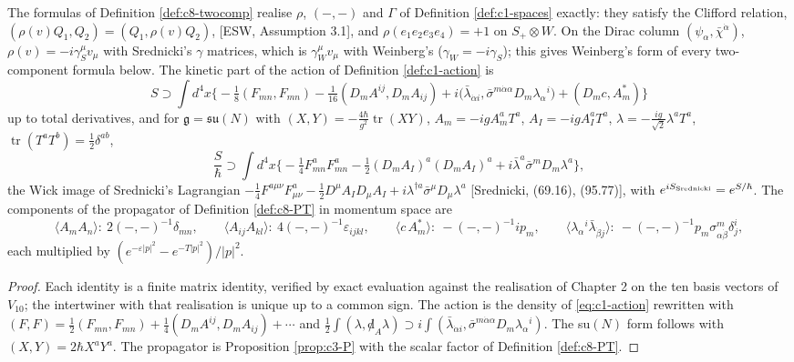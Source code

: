 \begin{definition}
\end{definition}

\begin{proposition}
\label{prop:c8-twocomp}
The formulas of Definition \ref{def:c8-twocomp} realise $\rho$, $(-,-)$ and $\Gamma$ of Definition \ref{def:c1-spaces} exactly: they satisfy the Clifford relation, $(\rho(v)Q_1,Q_2)=(Q_1,\rho(v)Q_2)$, [ESW, Assumption 3.1], and $\rho(e_1e_2e_3e_4)=+1$ on $S_+\otimes W$. On the Dirac column $(\psi_\alpha,\bar\chi^{\dot\alpha})$, $\rho(v)=-i\gamma_S^\mu v_\mu$ with Srednicki's $\gamma$ matrices, which is $\gamma_W^\mu v_\mu$ with Weinberg's ($\gamma_W=-i\gamma_S$); this gives Weinberg's form of every two-component formula below. The kinetic part of the action of Definition \ref{def:c1-action} is
\[
S\supset\int d^4x\Big\{-\tfrac18(F_{mn},F_{mn})-\tfrac1{16}(D_mA^{ij},D_mA_{ij})+i\big(\bar\lambda_{\dot\alpha i},\bar\sigma^{m\dot\alpha\alpha}D_m\lambda_\alpha{}^i\big)+(D_mc,A^*_m)\Big\}
\]
up to total derivatives, and for $\mathfrak g=\mathfrak{su}(N)$ with $(X,Y)=-\tfrac{4\hbar}{g^2}\operatorname{tr}(XY)$, $A_m=-igA^a_mT^a$, $A_I=-igA^a_IT^a$, $\lambda=-\tfrac{ig}{\sqrt2}\lambda^aT^a$, $\operatorname{tr}(T^aT^b)=\tfrac12\delta^{ab}$,
\[
\frac S\hbar\supset\int d^4x\Big\{-\tfrac14F^a_{mn}F^a_{mn}-\tfrac12(D_mA_I)^a(D_mA_I)^a+i\bar\lambda^a\bar\sigma^mD_m\lambda^a\Big\},
\]
the Wick image of Srednicki's Lagrangian $-\tfrac14F^{a\mu\nu}F^a_{\mu\nu}-\tfrac12D^\mu A_ID_\mu A_I+i\lambda^{\dagger a}\bar\sigma^\mu D_\mu\lambda^a$ [Srednicki, (69.16), (95.77)], with $e^{iS_{\rm Srednicki}}=e^{S/\hbar}$. The components of the propagator of Definition \ref{def:c8-PT} in momentum space are
\[
\langle A_mA_n\rangle:\ 2(-,-)^{-1}\delta_{mn},\qquad \langle A_{ij}A_{kl}\rangle:\ 4(-,-)^{-1}\varepsilon_{ijkl},\qquad \langle c\,A^*_m\rangle:\ -(-,-)^{-1}ip_m,\qquad \langle\lambda_\alpha{}^i\bar\lambda_{\dot\beta j}\rangle:\ -(-,-)^{-1}p_m\sigma^m_{\alpha\dot\beta}\delta^i_j,
\]
each multiplied by $(e^{-\varepsilon|p|^2}-e^{-T|p|^2})/|p|^2$.
\end{proposition}

\begin{proof}
Each identity is a finite matrix identity, verified by exact evaluation against the realisation of Chapter 2 on the ten basis vectors of $V_{10}$; the intertwiner with that realisation is unique up to a common sign. The action is the density of \eqref{eq:c1-action} rewritten with $(F,F)=\tfrac12(F_{mn},F_{mn})+\tfrac14(D_mA^{ij},D_mA_{ij})+\cdots$ and $\tfrac12\int(\lambda,{\not d}_A\lambda)\supset i\int(\bar\lambda_{\dot\alpha i},\bar\sigma^{m\dot\alpha\alpha}D_m\lambda_\alpha{}^i)$. The su$(N)$ form follows with $(X,Y)=2\hbar X^aY^a$. The propagator is Proposition \ref{prop:c3-P} with the scalar factor of Definition \ref{def:c8-PT}.
\end{proof}

